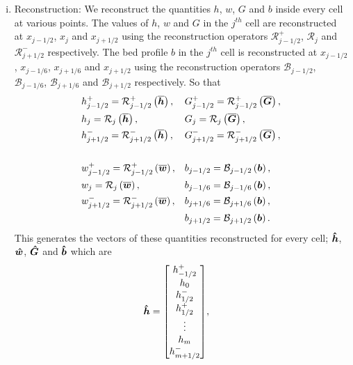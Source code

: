 \begin{enumerate}[(i)]
	\item Reconstruction: We reconstruct the quantities $h$, $w$, $G$ and $b$ inside every cell at various points. The values of $h$, $w$ and $G$ in the $j^{th}$ cell are reconstructed at $x_{j-1/2}$, $x_{j}$ and $x_{j+1/2}$ using the reconstruction operators $\mathcal{R}^+_{j-1/2}$, $\mathcal{R}_{j}$ and $\mathcal{R}^-_{j+1/2}$ respectively. The bed profile $b$ in the $j^{th}$ cell is reconstructed at $x_{j-1/2}$, $x_{j-1/6}$, $x_{j+1/6}$ and $x_{j+1/2}$ using the reconstruction operators $\mathcal{B}_{j-1/2}$, $\mathcal{B}_{j-1/6}$, $\mathcal{B}_{j+1/6}$ and $\mathcal{B}_{j+1/2}$ respectively. So that
	\begin{align*}	&h^+_{j-1/2} = \mathcal{R}^+_{j-1/2} \left(\overline{\boldsymbol{h}}\right),&& G^+_{j-1/2} = \mathcal{R}^+_{j-1/2} \left(\overline{\boldsymbol{G}}\right),\\
	&h_j = \mathcal{R}_{j} \left(\overline{\boldsymbol{h}}\right),&& G_j = \mathcal{R}_{j} \left(\overline{\boldsymbol{G}}\right),\\
	&h^-_{j+1/2} = \mathcal{R}^-_{j+1/2}\left(\overline{\boldsymbol{h}}\right),&& G^-_{j+1/2} = \mathcal{R}^-_{j+1/2} \left(\overline{\boldsymbol{G}}\right),\\ \\
	&w^+_{j-1/2} = \mathcal{R}^+_{j-1/2} \left(\overline{\boldsymbol{w}}\right), &&b_{j-1/2} = \mathcal{B}_{j-1/2} \left(\boldsymbol{b}\right),  \\
	&w_{j} = \mathcal{R}_{j} \left(\overline{\boldsymbol{w}}\right), &&b_{j-1/6} = \mathcal{B}_{j-1/6}  \left(\boldsymbol{b}\right),\\
	&w^-_{j+1/2} = \mathcal{R}^-_{j+1/2} \left(\overline{\boldsymbol{w}}\right), &&b_{j+1/6} = \mathcal{B}_{j+1/6} \left(\boldsymbol{b}\right), \\
	& && b_{j+1/2} = \mathcal{B}_{j+1/2}  \left(\boldsymbol{b}\right).\\
	\end{align*}
	This generates the vectors of these quantities reconstructed for every cell; $\boldsymbol{\hat{h}}$, $\boldsymbol{\hat{w}}$, $\boldsymbol{\hat{G}}$ and $\boldsymbol{\hat{b}}$ which are
	\begin{align*}\vecn{\hat{h}} = \begin{bmatrix}
	h^+_{-1/2} \\ h_0 \\ h^-_{1/2} \\ h^+_{1/2}  \\ \vdots \\ h_m \\ h^-_{m+1/2}\end{bmatrix} &,&

\end{align*}
\end{enumerate}
